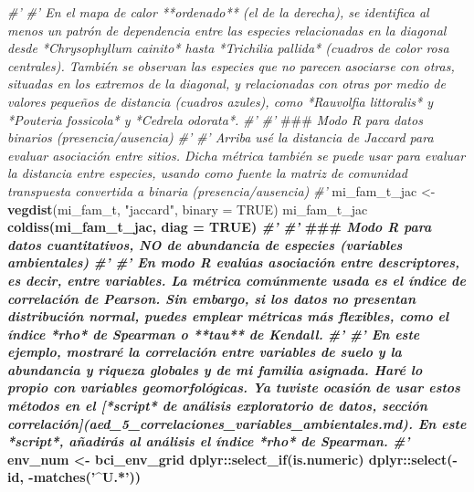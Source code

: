 \documentclass[11pt,]{article}
\newenvironment{Shaded}{\begin{snugshade}}{\end{snugshade}}
\newcommand{\KeywordTok}[1]{\textcolor[rgb]{0.13,0.29,0.53}{\textbf{#1}}}
\newcommand{\DataTypeTok}[1]{\textcolor[rgb]{0.13,0.29,0.53}{#1}}
\newcommand{\StringTok}[1]{\textcolor[rgb]{0.31,0.60,0.02}{#1}}
\newcommand{\CommentTok}[1]{\textcolor[rgb]{0.56,0.35,0.01}{\textit{#1}}}
\newcommand{\OtherTok}[1]{\textcolor[rgb]{0.56,0.35,0.01}{#1}}
\newcommand{\OperatorTok}[1]{\textcolor[rgb]{0.81,0.36,0.00}{\textbf{#1}}}
\newcommand{\AlertTok}[1]{\textcolor[rgb]{0.94,0.16,0.16}{#1}}
\newcommand{\NormalTok}[1]{#1}
\begin{document}
\begin{Shaded}
\begin{Highlighting}[]
{{{{{\CommentTok{#'}
\CommentTok{#' En el mapa de calor **ordenado** (el de la derecha), se identifica al menos un patrón de dependencia entre las especies relacionadas en la diagonal desde *Chrysophyllum cainito* hasta *Trichilia pallida* (cuadros de color rosa centrales). También se observan las especies que no parecen asociarse con otras, situadas en los extremos de la diagonal, y relacionadas con otras por medio de valores pequeños de distancia (cuadros azules), como *Rauvolfia littoralis* y *Pouteria fossicola* y *Cedrela odorata*.}
\CommentTok{#' }
\CommentTok{#' }\AlertTok{###}\CommentTok{ Modo R para datos binarios (presencia/ausencia)}
\CommentTok{#' }
\CommentTok{#' Arriba usé la distancia de Jaccard para evaluar asociación entre sitios. Dicha métrica también se puede usar para evaluar la distancia entre especies, usando como fuente la matriz de comunidad transpuesta convertida a binaria (presencia/ausencia)}
\CommentTok{#' }
\NormalTok{mi_fam_t_jac <-}\StringTok{ }\KeywordTok{vegdist}\NormalTok{(mi_fam_t, }\StringTok{"jaccard"}\NormalTok{, }\DataTypeTok{binary =} \OtherTok{TRUE}\NormalTok{)}
\NormalTok{mi_fam_t_jac }\OperatorTok{%
\KeywordTok{coldiss}\NormalTok{(mi_fam_t_jac, }\DataTypeTok{diag =} \OtherTok{TRUE}\NormalTok{)}
\CommentTok{#'}
\CommentTok{#' }\AlertTok{###}\CommentTok{ Modo R para datos cuantitativos, NO de abundancia de especies (variables ambientales)}
\CommentTok{#' }
\CommentTok{#' En modo R evalúas asociación entre descriptores, es decir, entre variables. La métrica comúnmente usada es el índice de correlación de Pearson. Sin embargo, si los datos no presentan distribución normal, puedes emplear métricas más flexibles, como el índice *rho* de Spearman o **tau** de Kendall.}
\CommentTok{#' }
\CommentTok{#' En este ejemplo, mostraré la correlación entre variables de suelo y la abundancia y riqueza globales y de mi familia asignada. Haré lo propio con variables geomorfológicas. Ya tuviste ocasión de usar estos métodos en el [*script* de análisis exploratorio de datos, sección correlación](aed_5_correlaciones_variables_ambientales.md). En este *script*, añadirás al análisis el índice *rho* de Spearman.}
\CommentTok{#' }
\NormalTok{env_num <-}\StringTok{ }\NormalTok{bci_env_grid }\OperatorTok{%
\StringTok{  }\NormalTok{dplyr}\OperatorTok{::}\KeywordTok{select_if}\NormalTok{(is.numeric) }\OperatorTok{%
\StringTok{  }\NormalTok{dplyr}\OperatorTok{::}\KeywordTok{select}\NormalTok{(}\OperatorTok{-}\NormalTok{id, }\OperatorTok{-}\KeywordTok{matches}\NormalTok{(}\StringTok{'^U.*'}\NormalTok{)) }\OperatorTok{%
}}}}}}}}}
\end{Highlighting}
\end{Shaded}
\end{document}
